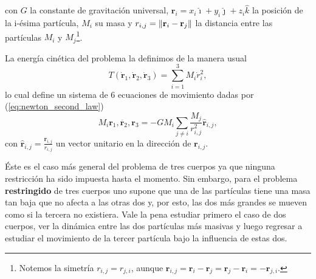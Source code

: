 con $G$ la constante de gravitación universal, $\mathbf{r}_i = x_i \hat{\imath} + y_i \hat{\jmath} + z_i \hat{k}$ la posición de la i-ésima partícula, $M_i$ su masa y $r_{i,j} = \left\lVert \mathbf{r}_i - \mathbf{r}_j\right\rVert$ la distancia entre las partículas $M_i$ y $M_j$\footnote{Notemos la simetría $r_{i,j} = r_{j,i}$, aunque $\mathbf{r}_{i,j} = \mathbf{r}_i - \mathbf{r}_j = \mathbf{r}_j - \mathbf{r}_i  = - \mathbf{r}_{j,i}$.}. 

La energía cinética del problema la definimos de la manera usual 
\begin{equation}
 T(\dot{\mathbf{r}}_1,\dot{\mathbf{r}}_2,\dot{\mathbf{r}}_3) = \sum_{i=1}^3 M_i \dot{r}_i^2,
 \label{eq:3body_kinetic}
\end{equation}
lo cual define un sistema de 6 ecuaciones de movimiento dadas por (\ref{eq:newton_second_law})
\begin{equation}
 M_i \ddot{\mathbf{r}_1,\mathbf{r}_2,\mathbf{r}_3} = - G M_i \sum_{j\neq i} \frac{M_j}{r_{i,j}^2} \hat{\mathbf{r}}_{i,j},
 \label{eq:3body_eqs_motion}
\end{equation}
con $\hat{\mathbf{r}}_{i,j} = \frac{\mathbf{r}_{i,j}}{r_{i,j}}$ un vector unitario en la dirección de $\mathbf{r}_{i,j}$.

Éste es el caso más general del problema de tres cuerpos ya que ninguna restricción ha sido impuesta hasta el momento. Sin embargo, para el problema \textbf{restringido} de tres cuerpos uno supone que una de las partículas tiene una masa tan baja que no afecta a las otras dos y, por esto, las dos más grandes se mueven como si la tercera no existiera. Vale la pena estudiar primero el caso de dos cuerpos, ver la dinámica entre las dos partículas más masivas y luego regresar a estudiar el movimiento de la tercer partícula bajo la influencia de estas dos. 

